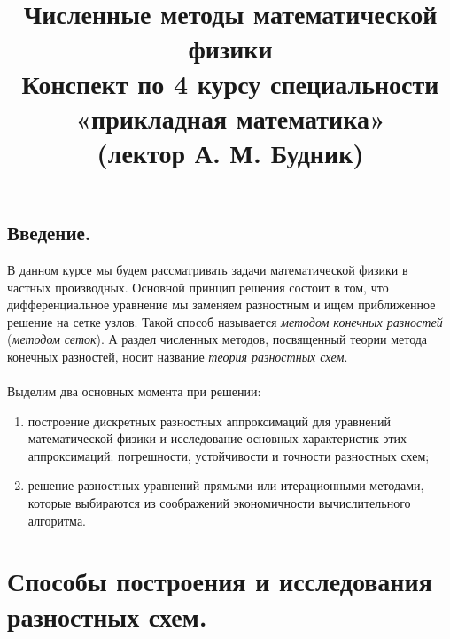 \documentclass[a4paper, 12pt]{report}
\title{\textbf{\Huge{Численные методы математической физики}}\\Конспект по 4 курсу 
специальности «прикладная математика»\\(лектор А. М. Будник)}
\date{}
\numberwithin{equation}{section}
\begin{document}
\maketitle
\tableofcontents{}
\newpage
\section*{Введение.}
В данном курсе мы будем рассматривать задачи математической физики в частных производных. Основной принцип решения состоит в том, что дифференциальное уравнение мы заменяем разностным и ищем приближенное решение на сетке узлов. Такой способ называется \textit{методом конечных разностей} (\textit{методом сеток}). А раздел численных методов, посвященный теории метода конечных разностей, носит название \textit{теория разностных схем}. 
\\\\
Выделим два основных момента при решении:
\begin{enumerate}
\item построение дискретных разностных аппроксимаций для уравнений математической физики и исследование основных характеристик этих аппроксимаций: погрешности, устойчивости и точности разностных схем;
\item решение разностных уравнений прямыми или итерационными методами, которые выбираются из соображений экономичности вычислительного алгоритма.
\end{enumerate}
\chapter{Способы построения и исследования разностных схем.}
\end{document}
